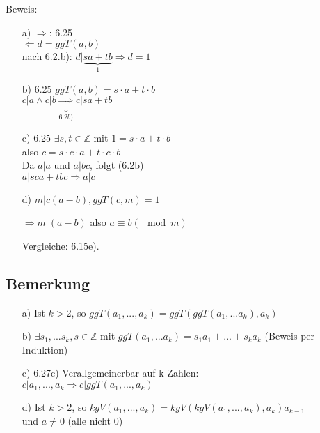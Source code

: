 \documentclass[a4paper, 12pt, twoside] {article}
\begin{document}
Beweis:

\begin{itemize}

\item[a)] $\Rightarrow$: 6.25 \\
$\Leftarrow d = ggT(a, b)$ \\
nach 6.2.b): $d | \underbrace{sa + tb}_{1} \Rightarrow d = 1$

\item[b)] 6.25 $ggT(a, b) = s \cdot a + t \cdot b$ \\
$c |a \wedge c | b \underbrace{\Rightarrow}_{6.2b)} c | sa + tb$

\item[c)] 6.25 $\exists s, t \in \mathbb{Z}$ mit $1 = s \cdot a + t \cdot b$ \\
also $c = s \cdot c \cdot a + t \cdot c \cdot b$ \\
Da $a | a$ und $a | bc$, folgt (6.2b) \\
$a | sca + tbc \Rightarrow a | c$

\item[d)] $m | c (a-b), ggT(c, m) = 1$

$\Rightarrow m | (a -b)$ also $a \equiv b (\mod m)$

Vergleiche: 6.15e).

\end{itemize}

\subsection{Bemerkung} %

\begin{itemize}

\item[a)] Ist $k > 2$, so $ggT(a_1, ..., a_k) = ggT(ggT(a_1, ...a_k), a_k)$

\item[b)] $\exists s_1, ... s_k, s \in \mathbb{Z}$ mit $ggT(a_1, ... a_k) = s_1 a_1 + ... + s_k a_k$ (Beweis per Induktion)

\item[c)] 6.27c) Verallgemeinerbar auf k Zahlen: \\
$c | a_1, ... , a_k \Rightarrow c | ggT(a_1, ... , a_k)$

\item[d)] Ist $k > 2$, so $kgV(a_1, ... , a_k) = kgV(kgV(a_1, ..., a_k), a_k) a_{k-1}$ \\
und $a \neq 0$ (alle nicht 0)

\end{itemize}
\end{document}
